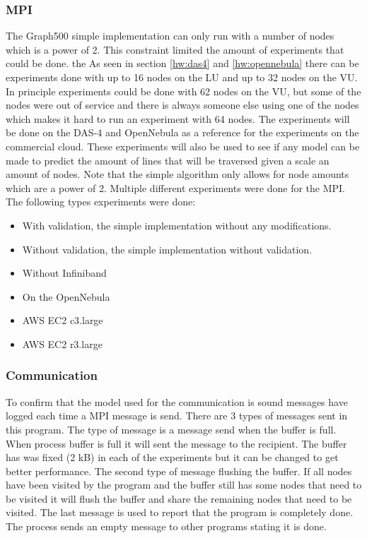 \subsubsection{MPI}
The Graph500 simple implementation can only run with a number of nodes which is a power of 2. This constraint limited the amount of experiments that could be done. the As seen in section \ref{hw:das4} and \ref{hw:opennebula} there can be experiments done with up to 16 nodes on the LU and up to 32 nodes on the VU. In principle experiments could be done with 62 nodes on the VU, but some of the nodes were out of service and there is always someone else using one of the nodes which makes it hard to run an experiment with 64 nodes.
The experiments will be done on the DAS-4 and OpenNebula as a reference for the experiments on the commercial cloud. These experiments will also be used to see if any model can be made to predict the amount of lines that will be traversed given a scale an amount of nodes. Note that the simple algorithm only allows for node amounts which are a power of 2. Multiple different experiments were done for the MPI. The following types experiments were done:
\begin{itemize}
	\item With validation, the simple implementation without any modifications.
	\item Without validation, the simple implementation without validation.
	\item Without Infiniband
	\item On the OpenNebula
	\item AWS EC2 c3.large 
	\item AWS EC2 r3.large 
\end{itemize}

\subsubsection{Communication}
\label{med:comm}
To confirm that the model used for the communication is sound messages have logged each time a MPI message is send. There are 3 types of messages sent in this program. The type of message is a message send when the buffer is full. When process buffer is full it will sent the message to the recipient. The buffer has was fixed (2 kB) in each of the experiments but it can be changed to get better performance. The second type of message flushing the buffer. If all nodes have been visited by the program and the buffer still has some nodes that need to be visited it will flush the buffer and share the remaining nodes that need to be visited. The last message is used to report that the program is completely done. The process sends an empty message to other programs stating it is done.

